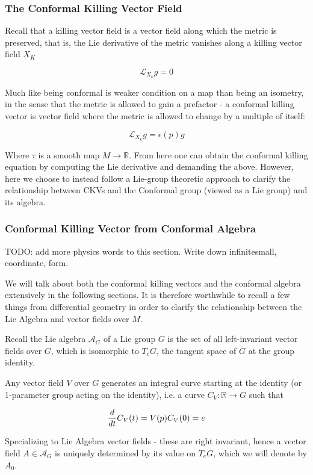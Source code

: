 \subsubsection{ The Conformal Killing Vector Field}

Recall that a killing vector field is a vector field along which the metric is preserved, that is, the Lie derivative of the metric vanishes along a killing vector field $X_K$

$$\mathcal{L}_{X_k}g = 0$$

Much like being conformal is weaker condition on a map than being an isometry, in the sense that the metric is allowed to gain a prefactor - a conformal killing vector is vector field where the metric is allowed to change by a multiple of itself:

$$\mathcal{L}_{X_k}g = \epsilon(p) g$$

Where $\tau$ is a smooth map $M  \to \mathbb{R}$. From here one can obtain the conformal killing equation by computing the Lie derivative and demanding the above. However, here we choose to instead follow a Lie-group theoretic approach to clarify the relationship between CKVs and the Conformal group (viewed as a Lie group) and its algebra.


\subsubsection{ Conformal Killing Vector from Conformal Algebra}

TODO: add more physics words to this section. Write down infinitesmall, coordinate, form.

We will talk about both the conformal killing vectors and the conformal algebra extensively in the following sections. It is therefore worthwhile to recall a few things from differential geometry in order to clarify the relationship between the Lie Algebra and vector fields over $M$.

Recall the Lie algebra $\mathcal{A}_G$ of a Lie group $G$ is the set of all left-invariant vector fields over $G$, which is isomorphic to $T_eG$, the tangent space of $G$ at the group identity. 

Any vector field $V$ over $G$ generates an integral curve starting at the identity (or 1-parameter group acting on the identity), i.e. a curve $C_{V} : \mathbb{R} \to G$ such that

$$\frac{d}{dt} C_V(t) = V(p)\\ C_V(0) = e$$

Specializing to Lie Algebra vector fields - these are right invariant, hence a vector field $A \in \mathcal{A}_G$ is uniquely determined by its value on $T_eG$, which we will denote by $A_0$. 

